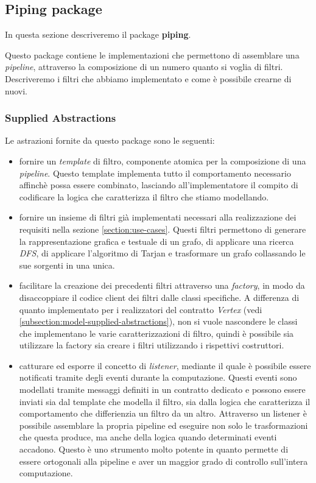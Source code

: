\subsection{Piping package}

In questa sezione descriveremo il package \textbf{piping}.

Questo package contiene le implementazioni che permettono di
assemblare una \emph{pipeline}, attraverso la composizione di un
numero quanto si voglia di filtri. Descriveremo i filtri che abbiamo
implementato e come \`e possibile crearne di nuovi.

\subsubsection*{Supplied Abstractions}

Le astrazioni fornite da questo package sono le seguenti:
\begin{itemize}
\item fornire un \emph{template} di filtro, componente atomica per la
  composizione di una \emph{pipeline}. Questo template implementa
  tutto il comportamento necessario affinch\`e possa essere combinato,
  lasciando all'implementatore il compito di codificare la logica che
  caratterizza il filtro che stiamo modellando.
\item fornire un insieme di filtri gi\`a implementati necessari alla
  realizzazione dei requisiti nella sezione
  \ref{section:use-cases}. Questi filtri permettono di generare la
  rappresentazione grafica e testuale di un grafo, di applicare una
  ricerca \emph{DFS}, di applicare l'algoritmo di Tarjan e trasformare
  un grafo collassando le sue sorgenti in una unica.
\item facilitare la creazione dei precedenti filtri attraverso una
  \emph{factory}, in modo da disaccoppiare il codice client dei filtri
  dalle classi specifiche. A differenza di quanto implementato per i
  realizzatori del contratto \emph{Vertex} (vedi
  \ref{subsection:model-supplied-abstractions}), non si vuole
  nascondere le classi che implementano le varie caratterizzazioni di
  filtro, quindi \`e possibile sia utilizzare la factory sia creare i
  filtri utilizzando i rispettivi costruttori.
\item catturare ed esporre il concetto di \emph{listener}, mediante il
  quale \`e possibile essere notificati tramite degli eventi durante
  la computazione. Questi eventi sono modellati tramite messaggi
  definiti in un contratto dedicato e possono essere inviati sia dal
  template che modella il filtro, sia dalla logica che caratterizza il
  comportamento che differienzia un filtro da un altro. Attraverso un
  listener \`e possibile assemblare la propria pipeline ed eseguire
  non solo le trasformazioni che questa produce, ma anche della logica
  quando determinati eventi accadono. Questo \`e uno strumento molto
  potente in quanto permette di essere ortogonali alla pipeline e aver
  un maggior grado di controllo sull'intera computazione.
\end{itemize}

